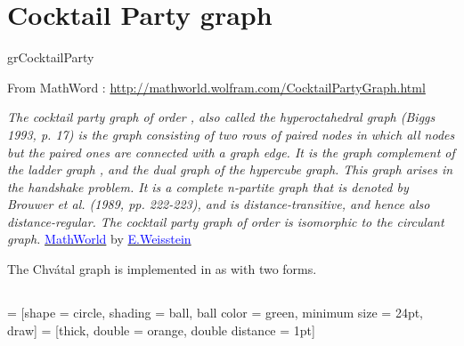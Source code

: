 \newpage\section{Cocktail Party graph}\label{cocktail}
\begin{NewMacroBox}{grCocktailParty}{}

\medskip
From MathWord : \url{http://mathworld.wolfram.com/CocktailPartyGraph.html}  

\emph{The cocktail party graph of order , also called the hyperoctahedral graph (Biggs 1993, p. 17) is the graph consisting of two rows of paired nodes in which all nodes but the paired ones are connected with a graph edge. It is the graph complement of the ladder graph , and the dual graph of the hypercube graph.\hfill\break
This graph arises in the handshake problem. It is a complete n-partite graph that is denoted  by Brouwer et al. (1989, pp. 222-223), and is distance-transitive, and hence also distance-regular.\hfill\break
The cocktail party graph of order  is isomorphic to the circulant graph.}
\href{http://mathworld.wolfram.com/topics/GraphTheory.html}%
           {\textcolor{blue}{MathWorld}} by \href{http://en.wikipedia.org/wiki/Eric_W._Weisstein}%
           {\textcolor{blue}{E.Weisstein}}

\medskip
The Chvátal graph is implemented in  as  with two forms.
\end{NewMacroBox}

\subsection{}
   = [shape          = circle,
                             shading         = ball,%
                             ball color      = green,%
                             minimum size    = 24pt,%
                             draw]
\SetVertexMath
{}     = [thick,%
                             double          = orange,%
                             double distance = 1pt] 
\begin{center}
   \begin{tkzexample}[vbox]
\end{tkzexample} 
\end{center}

\vfill\newpage
\subsection{}

\vspace*{2cm}
\begin{center}
   \begin{tkzexample}[vbox]
\end{tkzexample} 
\end{center}
\endinput
